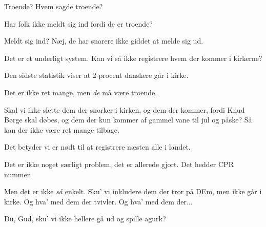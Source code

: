 \documentclass[a4paper,11pt]{article}
\begin{document}
\begin{sketch}
   Troende?  Hvem sagde troende?

   Har folk ikke meldt sig ind fordi de er troende?

   Meldt sig ind?  Næj, de har snarere ikke giddet at melde
  sig ud.

   Det er et underligt system.  Kan vi så ikke registrere hvem
  der kommer i kirkerne?

   Den sidste statistik viser at 2 procent danskere går i
  kirke.

   Det er ikke ret mange, men {\em de} må være troende.

   Skal vi ikke slette dem der snorker i kirken, og dem der
  kommer, fordi Knud Børge skal døbes, og dem der kun kommer af gammel
  vane til jul og påske?  Så kan der ikke være ret mange tilbage.

   Det betyder vi er nødt til at registrere næsten alle i
  landet.

   Det er ikke noget særligt problem, det er allerede gjort.
  Det hedder CPR nummer.

   Men det er ikke {\em så} enkelt.  Sku' vi inkludere dem
  der tror på DEm, men ikke går i kirke.  Og hva' med dem der tvivler.
  Og hva' med dem der...

   Du, Gud, sku' vi ikke hellere gå ud og spille agurk?

\end{sketch}
\end{document}
